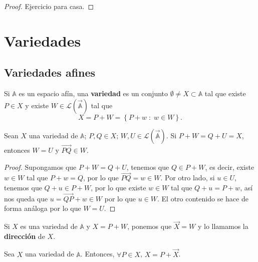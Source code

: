 \begin{proof}
Ejercicio para casa.
\end{proof}
\section{Variedades}
\subsection{Variedades afines}
\begin{definition}
Si $\displaystyle \mathbb{A} $ es un espacio afín, una \textbf{variedad} es un conjunto $\displaystyle \emptyset \neq X \subset \mathbb{A} $ tal que existe $\displaystyle P \in X $ y existe $\displaystyle W \in \mathcal{L}\left(\vec{\mathbb{A}}\right) $ tal que 
\[X = P + W = \left\{ P + w \; : \; w \in W\right\}  .\]
\end{definition}
\begin{lema}
Sean $\displaystyle X $ una variedad de $\displaystyle \mathbb{A} $; $\displaystyle P,Q \in X $; $\displaystyle W,U \in \mathcal{L}\left(\vec{\mathbb{A}}\right) $. Si $\displaystyle P + W = Q + U = X $, entonces $\displaystyle W = U $ y $\displaystyle \overrightarrow{PQ} \in W $.
\end{lema}
\begin{proof}
Supongamos que $\displaystyle P + W = Q + U $, tenemos que $\displaystyle Q \in P + W $, es decir, existe $\displaystyle w \in W $ tal que $\displaystyle P + w = Q $, por lo que $\displaystyle \overrightarrow{PQ} = w \in W $. Por otro lado, si $\displaystyle u \in U $, tenemos que $\displaystyle Q + u \in P + W $, por lo que existe $\displaystyle w \in W $ tal que $\displaystyle Q + u = P + w $, así nos queda que $\displaystyle u = \overrightarrow{QP} +w \in W $ por lo que $\displaystyle u \in W $. El otro contenido se hace de forma análoga por lo que $\displaystyle W = U $.
\end{proof}
\begin{notation}
Si $\displaystyle X $ es una variedad de $\displaystyle \mathbb{A} $ y $\displaystyle X = P + W $, ponemos que $\displaystyle \vec{X} = W $ y lo llamamos la \textbf{dirección} de $\displaystyle X $.
\end{notation}
\begin{lema}
Sea $\displaystyle X $ una variedad de $\displaystyle \mathbb{A} $. Entonces, $\displaystyle \forall P \in X $, $\displaystyle X = P + \vec{X} $.
\end{lema}
